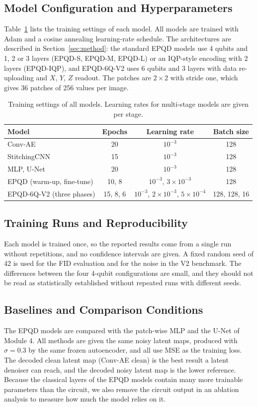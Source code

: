 \subsection{Model Configuration and Hyperparameters}
Table~\ref{tab:hyper} lists the training settings of each model. All models are trained with Adam and a cosine annealing learning-rate schedule. The architectures are described in Section~\ref{sec:method}: the standard EPQD models use 4 qubits and 1, 2 or 3 layers (EPQD-S, EPQD-M, EPQD-L) or an IQP-style encoding with 2 layers (EPQD-IQP), and EPQD-6Q-V2 uses 6 qubits and 3 layers with data re-uploading and $X$, $Y$, $Z$ readout. The patches are $2\times2$ with stride one, which gives 36 patches of 256 values per image.

\begin{table}[t]
\centering
\caption{Training settings of all models. Learning rates for multi-stage models are given per stage.}
\label{tab:hyper}
\begin{tabular}{lccc}
\toprule
\textbf{Model} & \textbf{Epochs} & \textbf{Learning rate} & \textbf{Batch size}\\
\midrule
Conv-AE & 20 & $10^{-3}$ & 128\\
StitchingCNN & 15 & $10^{-3}$ & 128\\
MLP, U-Net & 20 & $10^{-3}$ & 128\\
EPQD (warm-up, fine-tune) & 10, 8 & $10^{-3}$, $3\times10^{-3}$ & 128\\
EPQD-6Q-V2 (three phases) & 15, 8, 6 & $10^{-3}$, $2\times10^{-3}$, $5\times10^{-4}$ & 128, 128, 16\\
\bottomrule
\end{tabular}
\end{table}

\subsection{Training Runs and Reproducibility}
Each model is trained once, so the reported results come from a single run without repetitions, and no confidence intervals are given. A fixed random seed of 42 is used for the FID evaluation and for the noise in the V2 benchmark. The differences between the four 4-qubit configurations are small, and they should not be read as statistically established without repeated runs with different seeds.

\subsection{Baselines and Comparison Conditions}
The EPQD models are compared with the patch-wise MLP and the U-Net of Module 4. All methods are given the same noisy latent maps, produced with $\sigma=0.3$ by the same frozen autoencoder, and all use MSE as the training loss. The decoded clean latent map (Conv-AE clean) is the best result a latent denoiser can reach, and the decoded noisy latent map is the lower reference. Because the classical layers of the EPQD models contain many more trainable parameters than the circuit, we also remove the circuit output in an ablation analysis to measure how much the model relies on it.

